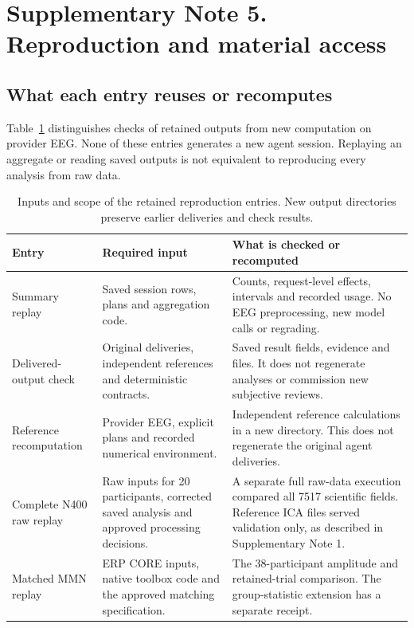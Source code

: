 \section*{Supplementary Note 5. Reproduction and material access}

\subsection*{What each entry reuses or recomputes}
Table~\ref{tab:reproduction} distinguishes checks of retained outputs from new computation on provider EEG. None of these entries generates a new agent session. Replaying an aggregate or reading saved outputs is not equivalent to reproducing every analysis from raw data.

\begin{table}[htbp]
\centering\small
\caption{Inputs and scope of the retained reproduction entries. New output directories preserve earlier deliveries and check results.}
\label{tab:reproduction}
\begin{tabularx}{\linewidth}{@{}l X X@{}}
\toprule
Entry & Required input & What is checked or recomputed\\
\midrule
Summary replay & Saved session rows, plans and aggregation code. & Counts, request-level effects, intervals and recorded usage. No EEG preprocessing, new model calls or regrading.\\
Delivered-output check & Original deliveries, independent references and deterministic contracts. & Saved result fields, evidence and files. It does not regenerate analyses or commission new subjective reviews.\\
Reference recomputation & Provider EEG, explicit plans and recorded numerical environment. & Independent reference calculations in a new directory. This does not regenerate the original agent deliveries.\\
Complete N400 raw replay & Raw inputs for 20 participants, corrected saved analysis and approved processing decisions. & A separate full raw-data execution compared all 7517 scientific fields. Reference ICA files served validation only, as described in Supplementary Note 1.\\
Matched MMN replay & ERP CORE inputs, native toolbox code and the approved matching specification. & The 38-participant amplitude and retained-trial comparison. The group-statistic extension has a separate receipt.\\
\bottomrule
\end{tabularx}
\end{table}

